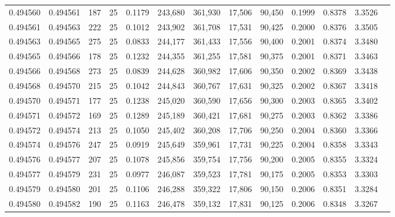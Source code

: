 \begin{tabular}{rrrrrrrrrrrrr}
0.494560 & 0.494561 &   187 &  25 &                                     0.1179 & 243,680 & 361,930 &  17,506 &  90,450 & 0.1999 & 0.8378 & 3.3526 \\
0.494561 & 0.494563 &   222 &  25 &                                     0.1012 & 243,902 & 361,708 &  17,531 &  90,425 & 0.2000 & 0.8376 & 3.3505 \\
0.494563 & 0.494565 &   275 &  25 &                                     0.0833 & 244,177 & 361,433 &  17,556 &  90,400 & 0.2001 & 0.8374 & 3.3480 \\
0.494565 & 0.494566 &   178 &  25 &                                     0.1232 & 244,355 & 361,255 &  17,581 &  90,375 & 0.2001 & 0.8371 & 3.3463 \\
0.494566 & 0.494568 &   273 &  25 &                                     0.0839 & 244,628 & 360,982 &  17,606 &  90,350 & 0.2002 & 0.8369 & 3.3438 \\
0.494568 & 0.494570 &   215 &  25 &                                     0.1042 & 244,843 & 360,767 &  17,631 &  90,325 & 0.2002 & 0.8367 & 3.3418 \\
0.494570 & 0.494571 &   177 &  25 &                                     0.1238 & 245,020 & 360,590 &  17,656 &  90,300 & 0.2003 & 0.8365 & 3.3402 \\
0.494571 & 0.494572 &   169 &  25 &                                     0.1289 & 245,189 & 360,421 &  17,681 &  90,275 & 0.2003 & 0.8362 & 3.3386 \\
0.494572 & 0.494574 &   213 &  25 &                                     0.1050 & 245,402 & 360,208 &  17,706 &  90,250 & 0.2004 & 0.8360 & 3.3366 \\
0.494574 & 0.494576 &   247 &  25 &                                     0.0919 & 245,649 & 359,961 &  17,731 &  90,225 & 0.2004 & 0.8358 & 3.3343 \\
0.494576 & 0.494577 &   207 &  25 &                                     0.1078 & 245,856 & 359,754 &  17,756 &  90,200 & 0.2005 & 0.8355 & 3.3324 \\
0.494577 & 0.494579 &   231 &  25 &                                     0.0977 & 246,087 & 359,523 &  17,781 &  90,175 & 0.2005 & 0.8353 & 3.3303 \\
0.494579 & 0.494580 &   201 &  25 &                                     0.1106 & 246,288 & 359,322 &  17,806 &  90,150 & 0.2006 & 0.8351 & 3.3284 \\
0.494580 & 0.494582 &   190 &  25 &                                     0.1163 & 246,478 & 359,132 &  17,831 &  90,125 & 0.2006 & 0.8348 & 3.3267 \\

\end{tabular}
